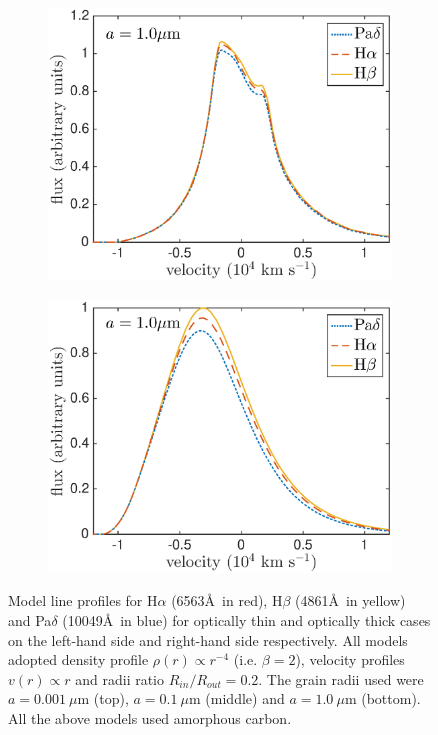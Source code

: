 \begin{figure}
\begin{subfigure}{0.5\textwidth}
\includegraphics[trim =10 0 25 15,clip=true,scale=0.42]{chapters/chapter4/images/dustdep/a1_opt_thin_HaHbPad}
\end{subfigure}
\hspace{3mm}
\begin{subfigure}{0.5\textwidth}
\includegraphics[trim =38 0 45 15,clip=true,scale=0.42]{chapters/chapter4/images/dustdep/a1_opt_thick_HaHbPad}
\end{subfigure}
\caption{Model line profiles for H$\alpha$ (6563\AA\ in red), H$\beta$ (4861\AA\ in yellow) and Pa$\delta$ (10049\AA\ in blue) for optically thin and  optically thick cases on the left-hand side and right-hand side respectively.  All models adopted density profile $\rho(r) \propto r^{-4}$ (i.e. $\beta = 2$), velocity profiles $v(r) \propto r$ and radii ratio $R_{in}/R_{out}=0.2$.  The grain radii used were $a=0.001~\mu$m (top), $a=0.1~\mu$m (middle) and $a=1.0~\mu$m (bottom). All the above models used amorphous carbon.}
\label{wav_dep}
\end{figure}

